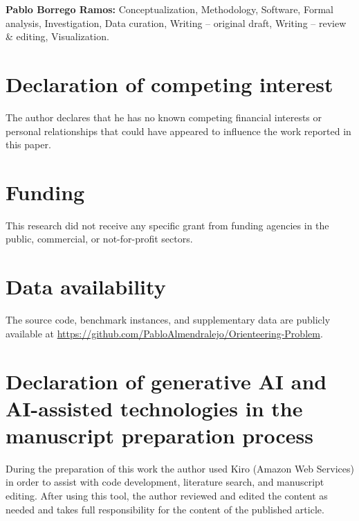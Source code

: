 \documentclass[preprint,11pt]{elsarticle}
\begin{document}
\textbf{Pablo Borrego Ramos:} Conceptualization, Methodology, Software, Formal analysis, Investigation, Data curation, Writing -- original draft, Writing -- review \& editing, Visualization.

\section*{Declaration of competing interest}

The author declares that he has no known competing financial interests or personal relationships that could have appeared to influence the work reported in this paper.

\section*{Funding}

This research did not receive any specific grant from funding agencies in the public, commercial, or not-for-profit sectors.

\section*{Data availability}

The source code, benchmark instances, and supplementary data are publicly available at \url{https://github.com/PabloAlmendralejo/Orienteering-Problem}.

\section*{Declaration of generative AI and AI-assisted technologies in the manuscript preparation process}

During the preparation of this work the author used Kiro (Amazon Web Services) in order to assist with code development, literature search, and manuscript editing. After using this tool, the author reviewed and edited the content as needed and takes full responsibility for the content of the published article.
\end{document}
